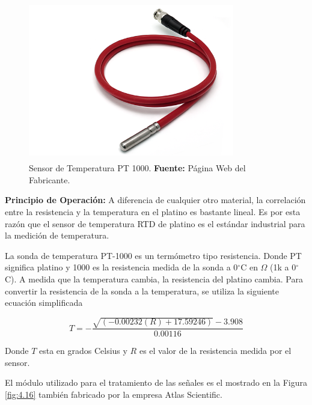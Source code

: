 \begin{figure}[ht]
    \centering
    \includegraphics[width=90mm, height=70mm]{Imagenes/2021/imag39.png}
    \caption[Sensor de Temperatura PT 1000]{Sensor de Temperatura PT 1000. \textbf{Fuente: } Página Web del Fabricante. }
    \label{fig:4.15}
\end{figure}


\textbf{Principio de Operación: }
A diferencia de cualquier otro material, la correlación entre la resistencia y la temperatura en el platino es bastante lineal. Es por esta razón que el sensor de temperatura RTD de platino es el estándar industrial para la medición de temperatura.

La sonda de temperatura PT-1000 es un termómetro tipo resistencia. Donde PT significa platino y 1000 es la resistencia medida de la sonda a 0$^{\circ}$C en $\Omega$ (1k a 0$^{\circ}$C).
A medida que la temperatura cambia, la resistencia del platino cambia.
Para convertir la resistencia de la sonda a la temperatura, se utiliza la siguiente ecuación simplificada

\begin{equation}
    T=-\frac{\sqrt{(-0.00232(R)+17.59246)}-3.908}{0.00116}
\end{equation}

Donde $T$ esta en grados Celsius y $R$ es el valor de la resistencia medida por el sensor.

El módulo utilizado para el tratamiento de las señales es el mostrado en la Figura \ref{fig:4.16} también fabricado por la empresa Atlas Scientific.

